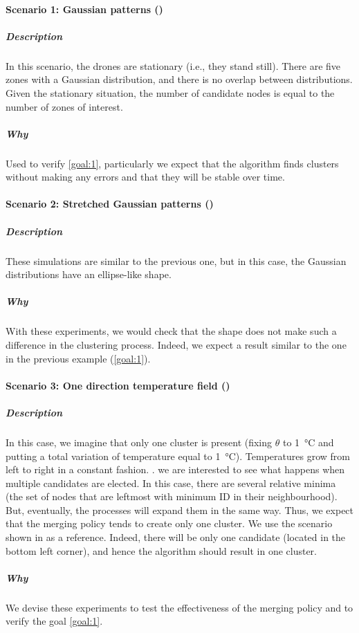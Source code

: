 \paragraph{Scenario 1: Gaussian patterns ()}
\subparagraph{Description}
In this scenario, the drones are stationary (i.e., they stand still).
 There are five zones with a Gaussian distribution, and there is no overlap between distributions.
 Given the stationary situation, the number of candidate nodes is equal to the number of zones of interest.

\subparagraph{Why} Used to verify \ref{goal:1}, particularly
 we expect that the algorithm finds clusters without making any errors and that they will be stable over time.
\paragraph{Scenario 2: Stretched Gaussian patterns ()}
\label{scenario-2}
\subparagraph{Description}
These simulations are similar to the previous one, but in this case, the Gaussian distributions have an ellipse-like shape.
\subparagraph{Why}
With these experiments, we would check that the shape does not make such a difference in the clustering process.
 Indeed, we expect a result similar to the one in the previous example (\ref{goal:1}).
\paragraph{Scenario 3: One direction temperature field ()}
\subparagraph{Description} In this case, we imagine that only one cluster is present
 (fixing $\theta$ to \SI{1}{\celsius} and putting a total variation of temperature equal to \SI{1}{\celsius}).
 Temperatures grow from left to right in a constant fashion. .
 we are interested to see what happens when multiple candidates are elected.
 In this case, there are several relative minima (the set of nodes that are leftmost with minimum ID in their neighbourhood).
 But, eventually, the processes will expand them in the same way.
 Thus, we expect that the merging policy tends to create only one cluster.
 We use the scenario shown in  as a reference.
Indeed, there will be only one candidate (located in the bottom left corner),
and hence the algorithm should result in one cluster.
\subparagraph{Why} We devise these experiments to test the effectiveness of the merging policy and to verify the goal \ref{goal:1}.


